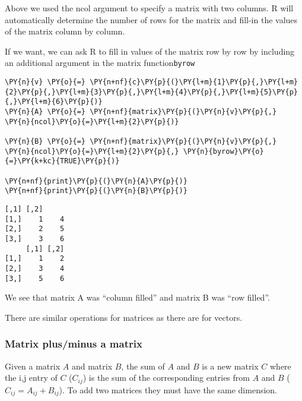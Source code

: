     
    Above we used the ncol argument to specify a matrix with two columns. R
will automatically determine the number of rows for the matrix and
fill-in the values of the matrix column by column.

If we want, we can ask R to fill in values of the matrix row by row by
including an additional argument in the matrix function\texttt{byrow}

    \begin{tcolorbox}[breakable, size=fbox, boxrule=1pt, pad at break*=1mm,colback=cellbackground, colframe=cellborder]
\begin{Verbatim}[commandchars=\\\{\}]
\PY{n}{v} \PY{o}{=} \PY{n+nf}{c}\PY{p}{(}\PY{l+m}{1}\PY{p}{,}\PY{l+m}{2}\PY{p}{,}\PY{l+m}{3}\PY{p}{,}\PY{l+m}{4}\PY{p}{,}\PY{l+m}{5}\PY{p}{,}\PY{l+m}{6}\PY{p}{)}
\PY{n}{A} \PY{o}{=} \PY{n+nf}{matrix}\PY{p}{(}\PY{n}{v}\PY{p}{,} \PY{n}{ncol}\PY{o}{=}\PY{l+m}{2}\PY{p}{)}

\PY{n}{B} \PY{o}{=} \PY{n+nf}{matrix}\PY{p}{(}\PY{n}{v}\PY{p}{,} \PY{n}{ncol}\PY{o}{=}\PY{l+m}{2}\PY{p}{,} \PY{n}{byrow}\PY{o}{=}\PY{k+kc}{TRUE}\PY{p}{)}

\PY{n+nf}{print}\PY{p}{(}\PY{n}{A}\PY{p}{)}
\PY{n+nf}{print}\PY{p}{(}\PY{n}{B}\PY{p}{)}
\end{Verbatim}
\end{tcolorbox}

    \begin{Verbatim}[commandchars=\\\{\}]
     [,1] [,2]
[1,]    1    4
[2,]    2    5
[3,]    3    6
     [,1] [,2]
[1,]    1    2
[2,]    3    4
[3,]    5    6
    \end{Verbatim}

    We see that matrix A was ``column filled'' and matrix B was ``row
filled''.

    There are similar operations for matrices as there are for vectors.

    \hypertarget{matrix-plusminus-a-matrix}{%
\subsubsection{Matrix plus/minus a
matrix}\label{matrix-plusminus-a-matrix}}

Given a matrix \(A\) and matrix \(B\), the sum of \(A\) and \(B\) is a
new matrix \(C\) where the i,j entry of \(C\) (\(C_{ij}\)) is the sum of
the corresponding entries from \(A\) and \(B\)
(\(C_{ij} = A_{ij} + B_{ij}\)). To add two matrices they must have the
same dimension.

